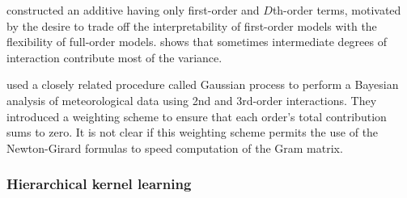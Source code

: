 \citet{plate1999accuracy} constructed an additive \gp{} having only first-order and $D$th-order terms, motivated by the desire to trade off the interpretability of first-order models with the flexibility of full-order models.
 shows that sometimes intermediate degrees of interaction contribute most of the variance.

\citet{kaufman2010bayesian} used a closely related procedure called Gaussian process \ANOVA{} to perform a Bayesian analysis of meteorological data using 2nd and 3rd-order interactions.
They introduced a weighting scheme to ensure that each order's total contribution sums to zero.
It is not clear if this weighting scheme permits the use of the Newton-Girard formulas to speed computation of the Gram matrix.


\subsubsection{Hierarchical kernel learning}

